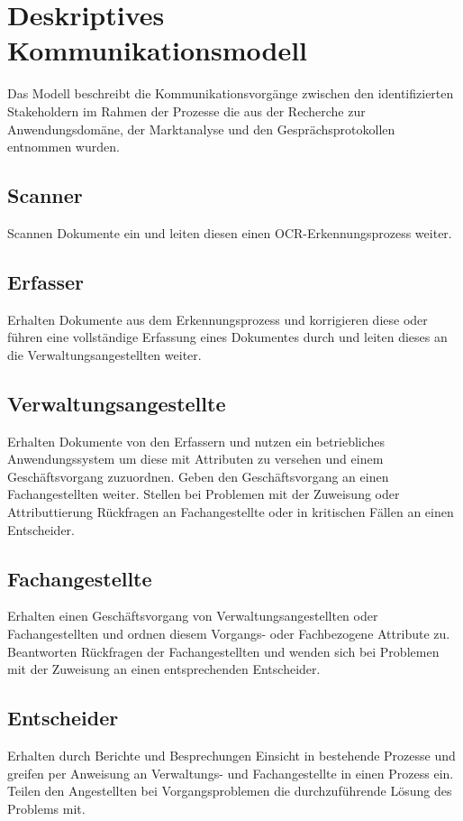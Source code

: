\documentclass[11pt,oneside,a4paper,notitlepage]{article}
\begin{document}
\section{Deskriptives Kommunikationsmodell}

Das Modell beschreibt die Kommunikationsvorgänge zwischen den identifizierten Stakeholdern im Rahmen der Prozesse die aus der Recherche zur Anwendungsdomäne, der Marktanalyse und den Gesprächsprotokollen entnommen wurden.


\subsection*{Scanner}
Scannen Dokumente ein und leiten diesen einen OCR-Erkennungsprozess weiter.

\subsection*{Erfasser}
Erhalten Dokumente aus dem Erkennungsprozess und korrigieren diese oder führen eine vollständige Erfassung eines
Dokumentes durch und leiten dieses an die Verwaltungsangestellten weiter.


\subsection*{Verwaltungsangestellte}
Erhalten Dokumente von den Erfassern und nutzen ein betriebliches Anwendungssystem um diese mit Attributen zu versehen und 
einem Geschäftsvorgang zuzuordnen. Geben den Geschäftsvorgang an einen Fachangestellten weiter. Stellen bei Problemen mit der Zuweisung oder Attributtierung Rückfragen an Fachangestellte oder in kritischen Fällen an einen Entscheider.


\subsection*{Fachangestellte}
Erhalten einen Geschäftsvorgang von Verwaltungsangestellten oder Fachangestellten und ordnen diesem Vorgangs- oder Fachbezogene Attribute zu. Beantworten Rückfragen der Fachangestellten und wenden sich bei Problemen mit der Zuweisung an einen entsprechenden Entscheider.


\subsection*{Entscheider}
Erhalten durch Berichte und Besprechungen Einsicht in bestehende Prozesse und greifen per Anweisung an Verwaltungs- und Fachangestellte in einen Prozess ein. Teilen den Angestellten bei Vorgangsproblemen die durchzuführende Lösung des Problems mit.
\end{document}
